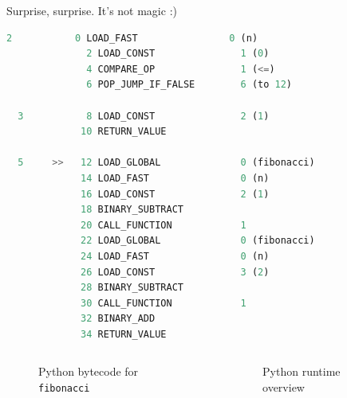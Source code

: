 \documentclass{beamer}
\begin{document}
\begin{frame}[fragile]{}
  Surprise, surprise. It's not magic :)
  \vspace{1cm}

  \begin{lrbox}{\mybox}%
    \begin{lstlisting}[language=Python]
  2           0 LOAD_FAST                0 (n)
              2 LOAD_CONST               1 (0)
              4 COMPARE_OP               1 (<=)
              6 POP_JUMP_IF_FALSE        6 (to 12)

  3           8 LOAD_CONST               2 (1)
             10 RETURN_VALUE

  5     >>   12 LOAD_GLOBAL              0 (fibonacci)
             14 LOAD_FAST                0 (n)
             16 LOAD_CONST               2 (1)
             18 BINARY_SUBTRACT
             20 CALL_FUNCTION            1
             22 LOAD_GLOBAL              0 (fibonacci)
             24 LOAD_FAST                0 (n)
             26 LOAD_CONST               3 (2)
             28 BINARY_SUBTRACT
             30 CALL_FUNCTION            1
             32 BINARY_ADD
             34 RETURN_VALUE
    \end{lstlisting}
  \end{lrbox}%
  
  \begin{columns}[b]
    \begin{column}{0.4\textwidth}
      \begin{figure}
      \scalebox{0.5}{\usebox{\mybox}}
      \caption{Python bytecode for \texttt{fibonacci}}
      \end{figure}
    \end{column}
    \begin{column}{0.4\textwidth}
      \begin{figure}
      \caption{Python runtime overview}
      \end{figure}
    \end{column}
  \end{columns}
\end{frame}
\end{document}
